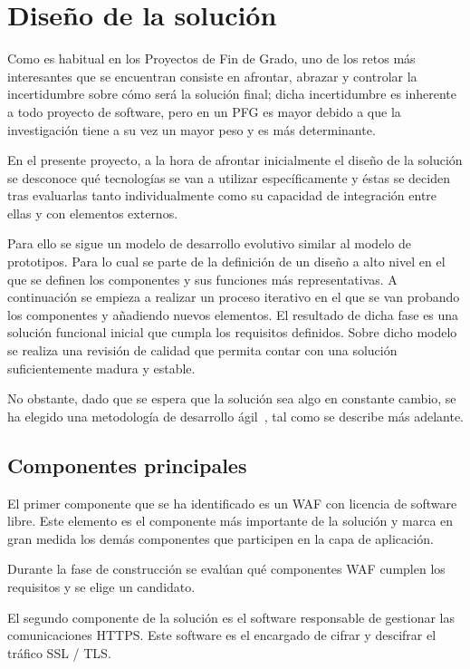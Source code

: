 \chapter{Diseño de la solución}
\par Como es habitual en los Proyectos de Fin de Grado, uno de los retos más interesantes que se encuentran consiste en afrontar, abrazar y controlar la incertidumbre sobre cómo será la solución final; dicha incertidumbre es inherente a todo
proyecto de software, pero en un PFG es mayor debido a que la investigación tiene a su vez un mayor peso y es más determinante.
\par En el presente proyecto, a la hora de afrontar inicialmente el diseño de la solución se desconoce qué tecnologías se van a utilizar específicamente y éstas se deciden tras evaluarlas tanto individualmente como su capacidad de integración
entre ellas y con elementos externos.
\par Para ello se sigue un modelo de desarrollo evolutivo similar al modelo de prototipos. Para lo cual se parte de la definición de un diseño a alto nivel en el que se definen los componentes y sus funciones más
representativas. A continuación se empieza a realizar un proceso iterativo en el que se van probando los componentes y añadiendo nuevos elementos. El resultado de dicha fase es una solución funcional inicial que cumpla
los requisitos definidos. Sobre dicho modelo se realiza una revisión de calidad que permita contar con una solución suficientemente madura y estable.
\par No obstante, dado que se espera que la solución sea algo en constante cambio, se ha elegido una metodología de desarrollo ágil~\cite{wiki:agil}, tal como se describe más adelante.

\section{Componentes principales}
\par El primer componente que se ha identificado es un WAF con licencia de software libre. Este elemento es el componente más importante de la solución y marca en gran medida los demás componentes que participen en la capa de aplicación.
\par Durante la fase de construcción se evalúan qué componentes WAF cumplen los requisitos y se elige un candidato.

\par El segundo componente de la solución es el software responsable de gestionar las comunicaciones HTTPS. Este software es el encargado de cifrar y descifrar el tráfico SSL / TLS.

